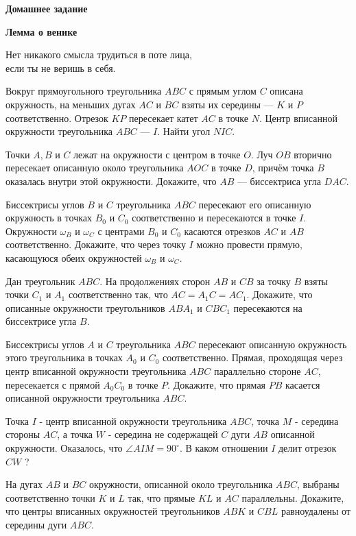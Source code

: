 \centerline{\bf \Huge Домашнее задание}
\centerline{\bf \Huge Лемма о венике}

\begin{flushright}
        \scriptsize{Нет никакого смысла трудиться в поте лица,\\ если ты не веришь в себя.}
\end{flushright}

Вокруг прямоугольного треугольника $A B C$ с прямым углом $C$ описана окружность, на меньших дугах $A C$ и $B C$ взяты их середины --- $K$ и $P$ соответственно. Отрезок $K P$ пересекает катет $A C$ в точке $N$. Центр вписанной окружности треугольника $A B C$ --- $I$. Найти угол $NIC$.

Точки $A, B$ и $C$ лежат на окружности с центром в точке $O$. Луч $O B$ вторично пересекает описанную около треугольника $A O C$ в точке $D$, причём точка $B$ оказалась внутри этой окружности. Докажите, что $A B$ --- биссектриса угла $D A C$.

Биссектрисы углов $B$ и $C$ треугольника $A B C$ пересекают его описанную окружность в точках $B_0$ и $C_0$ соответственно и пересекаются в точке $I$. Окружности $\omega_B$ и $\omega_C$ с центрами $B_0$ и $C_0$ касаются отрезков $A C$ и $A B$ соответственно. Докажите, что через точку $I$ можно провести прямую, касающуюся обеих окружностей $\omega_B$ и $\omega_C$.

Дан треугольник $A B C$. На продолжениях сторон $A B$ и $C B$ за точку $B$ взяты точки $C_1$ и $A_1$ соответственно так, что $A C=A_1 C=A C_1$. Докажите, что описанные окружности треугольников $A B A_1$ и $C B C_1$ пересекаются на биссектрисе угла $B$.

Биссектрисы углов $A$ и $C$ треугольника $A B C$ пересекают описанную окружность этого треугольника в точках $A_0$ и $C_0$ соответственно. Прямая, проходящая через центр вписанной окружности треугольника $A B C$ параллельно стороне $A C$, пересекается с прямой $A_0 C_0$ в точке $P$. Докажите, что прямая $P B$ касается описанной окружности треугольника $A B C$.

Точка $I$ - центр вписанной окружности треугольника $A B C$, точка $M$ - середина стороны $A C$, а точка $W$ - середина не содержащей $C$ дуги $A B$ описанной окружности. Оказалось, что $\angle A I M=90^{\circ}$. В каком отношении $I$ делит отрезок $C W$ ?

На дугах $A B$ и $B C$ окружности, описанной около треугольника $A B C$, выбраны соответственно точки $K$ и $L$ так, что прямые $K L$ и $A C$ параллельны. Докажите, что центры вписанных окружностей треугольников $A B K$ и $C B L$ равноудалены от середины дуги $A B C$.
